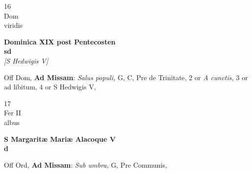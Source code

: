 \documentclass[10pt, openany]{book}
\begin{document}
        \begin{center}
            \begin{minipage}{3.5in}
                \vspace{2em}
                \begin{minipage}{0.5in}
                    {\Huge 16} \\
                    {\normalsize Dom} \\
                    {\normalsize viridis}
                \end{minipage}
                \begin{minipage}{3.0in}
                    \textbf{ \large Dominica XIX post Pentecosten \\
                    \textnormal{\normalsize sd}} \\ \textit{[S Hedwigis V]} \\ 
                \end{minipage}
                \begin{justify}Off Dom, \textbf{Ad Missam}: \textit{Salus populi,} G, C, Pre de Trinitate, 2 or \textit{A cunctis,} 3 or ad libitum, 4 or S Hedwigis V,   
                \end{justify}
            \end{minipage}
        \end{center}
    
        \begin{center}
            \begin{minipage}{3.5in}
                \vspace{2em}
                \begin{minipage}{0.5in}
                    {\Huge 17} \\
                    {\normalsize Fer II} \\
                    {\normalsize albus}
                \end{minipage}
                \begin{minipage}{3.0in}
                    \textbf{ \large S Margaritæ Mariæ Alacoque V \\
                    \textnormal{\normalsize d}} \\ 
                \end{minipage}
                \begin{justify}Off Ord, \textbf{Ad Missam}: \textit{Sub umbra,} G, Pre Communis,   
                \end{justify}
            \end{minipage}
        \end{center}
    
\end{document}
